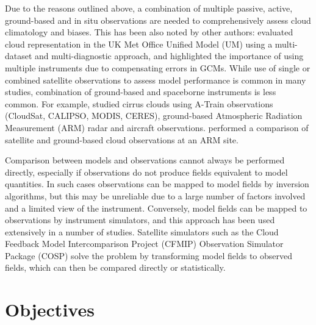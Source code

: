 Due to the reasons outlined above, a combination of multiple passive, active,
ground-based and in situ observations are needed to comprehensively assess
cloud climatology and biases. This has been also noted by other authors:
\cite{williams2017} evaluated cloud representation in the UK Met Office
Unified Model (UM) using a multi-dataset and multi-diagnostic approach, and
highlighted the
importance of using multiple instruments due to compensating errors in GCMs.
While use of single or combined satellite observations to assess model
performance is common in many studies,
combination of ground-based and spaceborne instruments is less common.
For example, \cite{muhlbauer2015} studied cirrus clouds using A-Train
observations (CloudSat, CALIPSO, MODIS, CERES), ground-based
Atmospheric Radiation Measurement (ARM) radar and aircraft observations.
\cite{zhang2017} performed a comparison of satellite and ground-based cloud
observations at an ARM site.

Comparison between models and observations cannot always be performed directly,
especially if observations do not produce fields equivalent to model quantities.
In such cases observations can be mapped to model fields by inversion algorithms,
but this may be unreliable
due to a large number of factors involved and a limited view of the instrument.
Conversely, model fields can be mapped to observations by instrument simulators,
and this approach has been used extensively in a number of studies.
Satellite simulators such as the Cloud Feedback Model Intercomparison Project (CFMIP) Observation Simulator Package (COSP)
\citep{bodas-salcedo2011} solve the problem
by transforming model fields to observed fields, which can then
be compared directly or statistically.

\section{Objectives}

